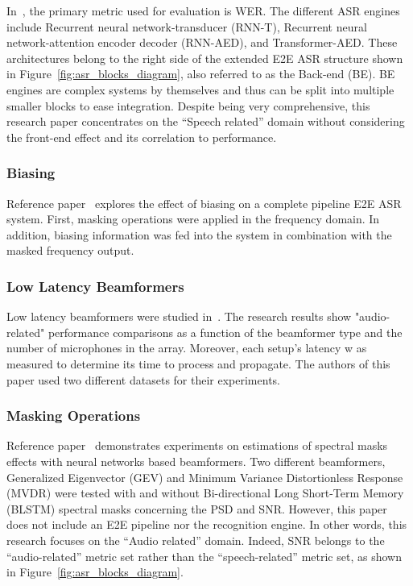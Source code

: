 In~\cite{900384911}, the primary metric used for evaluation is WER.
The different ASR engines include 
Recurrent neural network-transducer (RNN-T), 
Recurrent neural network-attention encoder decoder (RNN-AED),
and Transformer-AED.
These architectures belong to the right side
of the extended E2E ASR structure shown in 
Figure~\ref{fig:asr_blocks_diagram}, 
also referred to as the
Back-end (BE).
BE engines are complex systems by themselves
and thus can be split into multiple smaller
blocks to ease integration.
Despite being very comprehensive, this research paper 
concentrates on
the ``Speech related'' domain
without considering the front-end
effect and its correlation to performance.

\subsubsection{Biasing}
Reference paper~\cite{20202222222} explores the effect of biasing
on a complete pipeline E2E ASR system. 
First, masking operations were
applied in the frequency domain.
In addition, biasing information was fed
into the system in combination with the 
masked frequency output.



\subsubsection{Low Latency Beamformers}
Low latency beamformers were studied in~\cite{9003849}.
The research results show 
"audio-related" performance comparisons
as a function of the beamformer type and the number
of microphones in the array.
Moreover, each setup's latency w
as measured to determine 
its time to process and propagate.
The authors of this paper used
two different datasets for their experiments.

\subsubsection{Masking Operations}
Reference paper~\cite{7471664} demonstrates experiments on estimations of spectral masks effects
with neural networks based beamformers.
Two different beamformers,  Generalized Eigenvector (GEV)
and Minimum Variance Distortionless Response (MVDR) were tested with and without Bi-directional Long Short-Term Memory (BLSTM)
spectral masks concerning the PSD and SNR.
However, this paper does not include an E2E pipeline nor the recognition engine.
In other words, this research focuses on the ``Audio related'' domain.
Indeed, SNR belongs to the
``audio-related'' metric set rather than the
``speech-related'' metric set,
as shown in Figure~\ref{fig:asr_blocks_diagram}.
\bigskip

